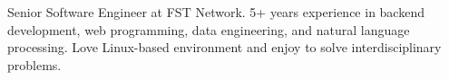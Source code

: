 

\begin{cvparagraph}

	Senior Software Engineer at FST Network. 5+ years experience in backend development, web programming, data engineering, and natural language processing. Love Linux-based environment and enjoy to solve interdisciplinary problems.
\end{cvparagraph}
